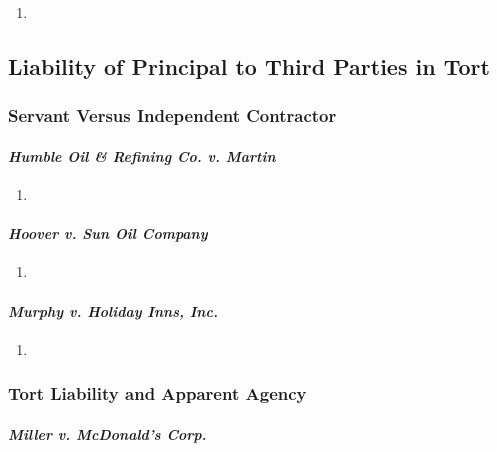 \begin{enumerate}
    \item %
\end{enumerate}

\subsection{Liability of Principal to Third Parties in Tort}

\subsubsection{Servant Versus Independent Contractor}

\paragraph{\emph{Humble Oil \& Refining Co. v. Martin}}

\begin{enumerate}
    \item %
\end{enumerate}

\paragraph{\emph{Hoover v. Sun Oil Company}}

\begin{enumerate}
    \item %
\end{enumerate}

\paragraph{\emph{Murphy v. Holiday Inns, Inc.}}

\begin{enumerate}
    \item %
\end{enumerate}

\subsubsection{Tort Liability and Apparent Agency}

\paragraph{\emph{Miller v. McDonald's Corp.}}

